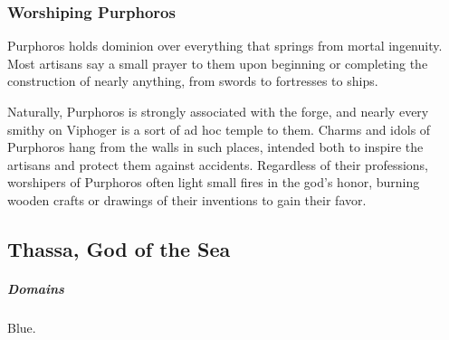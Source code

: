     \subsubsection{Worshiping Purphoros}
        Purphoros holds dominion over everything that springs from mortal ingenuity.
        Most artisans say a small prayer to them upon beginning or completing the construction of nearly anything, from swords to fortresses to ships.

        Naturally, Purphoros is strongly associated with the forge, and nearly every smithy on Viphoger is a sort of ad hoc temple to them.
        Charms and idols of Purphoros hang from the walls in such places, intended both to inspire the artisans and protect them against accidents.
        Regardless of their professions, worshipers of Purphoros often light small fires in the god's honor, burning wooden crafts or drawings of their inventions to gain their favor.

\pagebreak


\vspace{15.0cm}

\subsection*{Thassa, God of the Sea} \label{ssec::thassa}
    \subparagraph{Domains} Blue.

